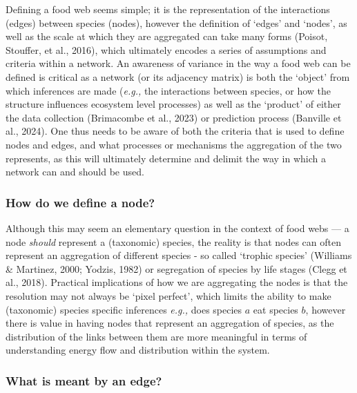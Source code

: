 \documentclass[
]{article}
\begin{document}
Defining a food web seems simple; it is the representation of the
interactions (edges) between species (nodes), however the definition of
`edges' and `nodes', as well as the scale at which they are aggregated
can take many forms (Poisot, Stouffer, et al., 2016), which ultimately
encodes a series of assumptions and criteria within a network. An
awareness of variance in the way a food web can be defined is critical
as a network (or its adjacency matrix) is both the `object' from which
inferences are made (\emph{e.g.,} the interactions between species, or
how the structure influences ecosystem level processes) as well as the
`product' of either the data collection (Brimacombe et al., 2023) or
prediction process (Banville et al., 2024). One thus needs to be aware
of both the criteria that is used to define nodes and edges, and what
processes or mechanisms the aggregation of the two represents, as this
will ultimately determine and delimit the way in which a network can and
should be used.

\subsubsection{How do we define a node?}\label{how-do-we-define-a-node}

Although this may seem an elementary question in the context of food
webs --- a node \emph{should} represent a (taxonomic) species, the
reality is that nodes can often represent an aggregation of different
species - so called `trophic species' (Williams \& Martinez, 2000;
Yodzis, 1982) or segregation of species by life stages (Clegg et al.,
2018). Practical implications of how we are aggregating the nodes is
that the resolution may not always be `pixel perfect', which limits the
ability to make (taxonomic) species specific inferences \emph{e.g.,}
does species \(a\) eat species \(b\), however there is value in having
nodes that represent an aggregation of species, as the distribution of
the links between them are more meaningful in terms of understanding
energy flow and distribution within the system.

\subsubsection{What is meant by an
edge?}\label{what-is-meant-by-an-edge}
\end{document}
